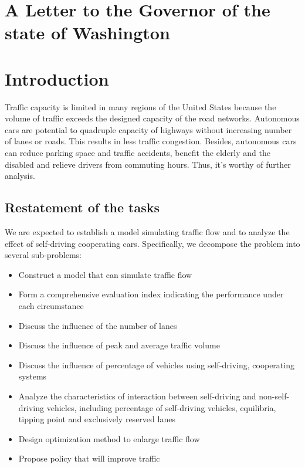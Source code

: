 \documentclass[a4paper]{article}
\begin{document}
    \section{A Letter to the Governor of the state of Washington}

    \newpage
    \tableofcontents
    \newpage

	\section{Introduction}
	Traffic capacity is limited in many regions of the United States because the volume of traffic exceeds the designed capacity of the road networks. Autonomous cars are potential to quadruple capacity of highways without increasing number of lanes or roads. This results in less traffic congestion. Besides, autonomous cars can reduce parking space and traffic accidents, benefit the elderly and the disabled and relieve drivers from commuting hours. Thus, it’s worthy of further analysis.

	\subsection{Restatement of the tasks}
	We are expected to establish a model simulating traffic flow and to analyze the effect of self-driving cooperating cars. Specifically, we decompose the problem into several sub-problems:
	\begin{itemize}
	    \item Construct a model that can simulate traffic flow
	    \item Form a comprehensive evaluation index indicating the performance under each circumstance
	    \item Discuss the influence of the number of lanes
	    \item Discuss the influence of peak and average traffic volume
	    \item Discuss the influence of percentage of vehicles using self-driving, cooperating systems
	    \item Analyze the characteristics of interaction between self-driving and non-self-driving vehicles, including percentage of self-driving vehicles, equilibria, tipping point and exclusively reserved lanes
	    \item Design optimization method to enlarge traffic flow
	    \item Propose policy that will improve traffic
	\end{itemize}
\end{document}
